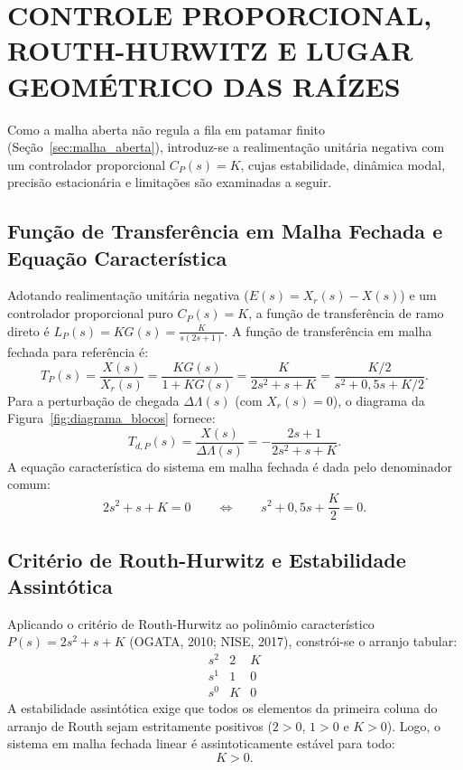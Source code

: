 \section{CONTROLE PROPORCIONAL, ROUTH-HURWITZ E LUGAR GEOMÉTRICO DAS RAÍZES}\label{sec:controle_p}

Como a malha aberta não regula a fila em patamar finito (Seção~\ref{sec:malha_aberta}), introduz-se a realimentação unitária negativa com um controlador proporcional $C_P(s) = K$, cujas estabilidade, dinâmica modal, precisão estacionária e limitações são examinadas a seguir.

\subsection{Função de Transferência em Malha Fechada e Equação Característica}\label{sec:ft_mf_p}
Adotando realimentação unitária negativa ($E(s) = X_r(s) - X(s)$) e um controlador proporcional puro $C_P(s) = K$, a função de transferência de ramo direto é $L_P(s) = K G(s) = \frac{K}{s(2s+1)}$. A função de transferência em malha fechada para referência é:
\begin{equation}
    T_P(s) = \frac{X(s)}{X_r(s)} = \frac{K G(s)}{1 + K G(s)} = \frac{K}{2s^2 + s + K} = \frac{K/2}{s^2 + 0{,}5s + K/2}.
    \label{eq:ft_mf_p}
\end{equation}
Para a perturbação de chegada $\Delta\Lambda(s)$ (com $X_r(s)=0$), o diagrama da Figura~\ref{fig:diagrama_blocos} fornece:
\begin{equation}
    T_{d,P}(s) = \frac{X(s)}{\Delta\Lambda(s)} = -\frac{2s + 1}{2s^2 + s + K}.
    \label{eq:ft_dist_p}
\end{equation}
A equação característica do sistema em malha fechada é dada pelo denominador comum:
\begin{equation}
    2s^2 + s + K = 0 \qquad \Longleftrightarrow \qquad s^2 + 0{,}5s + \frac{K}{2} = 0.
    \label{eq:ec_p}
\end{equation}

\subsection{Critério de Routh-Hurwitz e Estabilidade Assintótica}\label{sec:routh_p}
Aplicando o critério de Routh-Hurwitz ao polinômio característico $P(s) = 2s^2 + s + K$ (OGATA, 2010; NISE, 2017), constrói-se o arranjo tabular:
\[
\begin{array}{c|cc}
    s^2 & 2 & K \\
    s^1 & 1 & 0 \\
    s^0 & K & 0
\end{array}
\]
A estabilidade assintótica exige que todos os elementos da primeira coluna do arranjo de Routh sejam estritamente positivos ($2 > 0$, $1 > 0$ e $K > 0$). Logo, o sistema em malha fechada linear é assintoticamente estável para todo:
\begin{equation}
    K > 0.
\end{equation}

